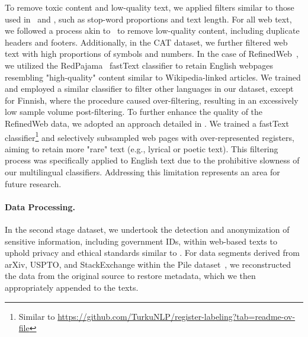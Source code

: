 To remove toxic content and low-quality text, we applied filters similar to those used in~\citet{nguyen2023culturax} and \citet{scao2022bloom}, such as stop-word proportions and text length.
% 
For all web text, we followed a process akin to~\citet{refinedweb} to remove low-quality content, including duplicate headers and footers. Additionally, in the CAT dataset, we further filtered web text with high proportions of symbols and numbers.
% 
In the case of RefinedWeb~\citep{refinedweb}, we utilized the RedPajama~\citep{together2023redpajama} fastText classifier to retain English webpages resembling "high-quality" content similar to Wikipedia-linked articles. We trained and employed a similar classifier to filter other languages in our dataset, except for Finnish, where the procedure caused over-filtering, resulting in an excessively low sample volume post-filtering.
% 
% 
% 
To further enhance the quality of the RefinedWeb data, we adopted an approach detailed in \citet{ronnqvist-etal-2021-multilingual}. We trained a fastText classifier\footnote{Similar to \url{https://github.com/TurkuNLP/register-labeling?tab=readme-ov-file}} and selectively subsampled web pages with over-represented registers, aiming to retain more "rare" text (e.g., lyrical or poetic text). This filtering process was specifically applied to English text due to the prohibitive slowness of our multilingual classifiers. Addressing this limitation represents an area for future research.




\paragraph{Data Processing.}
In the second stage dataset, we undertook the detection and anonymization of sensitive information, including government IDs, within web-based texts to uphold privacy and ethical standards similar to \citet{scao2022bloom}. For data segments derived from arXiv, USPTO, and StackExchange within the Pile dataset~\citep{gao2020pile}, we reconstructed the data from the original source to restore metadata, which we then appropriately appended to the texts.

